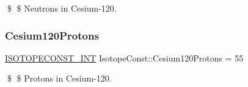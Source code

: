 \$ \$ Neutrons in Cesium-\/120. \mbox{\label{group___isotope_const-_cesium-_cs120_ga95f5e1131a3a291c2a23c7f65b0448c6}} 
\subsubsection{\texorpdfstring{Cesium120\+Protons}{Cesium120Protons}}
{\footnotesize\ttfamily \mbox{\hyperlink{group___isotope_const-_macros_ga5f18360b3e99483a35c32d789e62621c}{I\+S\+O\+T\+O\+P\+E\+C\+O\+N\+S\+T\+\_\+\+I\+NT}} Isotope\+Const\+::\+Cesium120\+Protons = 55}

\$ \$ Protons in Cesium-\/120. 